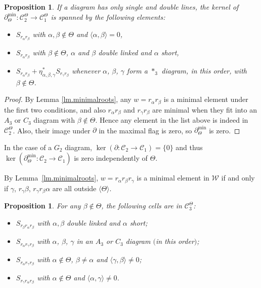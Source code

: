 \documentclass[10pt,a4paper]{amsart}
\numberwithin{equation}{section}
\newtheorem{Proposition}[Theorem]{Proposition}
 { \theoremstyle{definition}
\newtheorem{Definition}[Theorem]{Definition}
\newtheorem{Note}[Theorem]{Note}
\newtheorem{Example}[Theorem]{Example}
\newtheorem{Remark}[Theorem]{Remark} }
\begin{document}
\begin{Proposition}If a diagram has only single and double lines, the kernel of $\partial_\Theta^{\min}\colon \mathcal{C}_2^\Theta\longrightarrow \mathcal{C}_1^\Theta$ is spanned by the following elements:
\begin{itemize}\itemsep=0pt
\item $S_{r_\alpha r_\beta}$ with $\alpha,\beta\notin\Theta$ and $\langle\alpha, \beta \rangle=0$,
\item $S_{r_\alpha r_\beta}$ with $\beta\notin \Theta$, $\alpha$ and $\beta$ double linked and $\alpha$ short,
\item $S_{r_\alpha r_\beta}+ \eta^*_{\alpha,\beta,\gamma} S_{r_\gamma r_\beta}$ whenever $\alpha$, $\beta$, $\gamma$ form a $*_3$ diagram, in this order, with $\beta\notin \Theta$.
\end{itemize}
\end{Proposition}

\begin{proof}By Lemma \ref{lm.minimalroots}, any $w=r_{\alpha }r_{\beta }$ is a minimal element under the first two conditions, and also $r_{\alpha }r_{\beta }$ and $r_{\gamma }r_{\beta }$ are minimal when they fit into an $A_{3}$ or $C_{3}$ diagram with $\beta \notin \Theta $. Hence any element in the list above is indeed in $\mathcal{C}_{2}^{\Theta }$. Also, their image under $\partial $ in the maximal flag is zero, so $\partial _{\Theta }^{\min }$ is zero.
\end{proof}

In the case of a $G_2$ diagram, $\ker (\partial\colon \mathcal{C}_2\longrightarrow\mathcal{C}_1)=\{0\}$ and thus $\ker (\partial_\Theta^{\min}\colon \mathcal{C}_2\longrightarrow\mathcal{C}_1)$ is zero independently of $\Theta$.

By Lemma~\ref{lm.minimalroots}, $w= r_\alpha r_\beta r_\gamma$ is a minimal element in $\mathcal{W}$ if and only if $\gamma$, $r_\gamma\beta$, $r_\gamma r_\beta\alpha$ are all
outside $ \langle \Theta \rangle$.

\begin{Proposition}\label{pro.minimal3}For any $\beta \notin \Theta $, the following cells are in $\mathcal{C}_{3}^{\Theta }$:
\begin{itemize}\itemsep=0pt
\item $S_{r_\beta r_\alpha r_\beta}$ with $\alpha, \beta$ double linked and $\alpha$ short;

\item $S_{ r_{\alpha }r_{\gamma }r_{\beta }}$ with $\alpha$, $\beta$, $\gamma$ in an $A_{3}$ or $C_3$ diagram $($in this order$)$;

\item $S_{ r_{\alpha }r_{\gamma }r_{\beta }}$ with $\alpha\notin \Theta$, $\beta\neq \alpha$ and $ \langle \gamma, \beta \rangle\neq 0$;

\item $S_{r_{\gamma }r_{\alpha }r_{\beta }}$ with $\alpha\notin \Theta$ and $ \langle \alpha, \gamma \rangle\neq 0$.
\end{itemize}
\end{Proposition}
\end{document}
